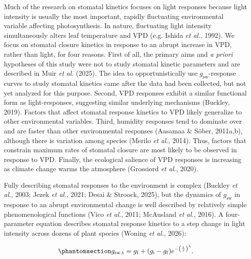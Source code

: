 \documentclass[
  letterpaper,
  DIV=11,
  numbers=noendperiod]{scrartcl}
\newcommand{\gsw}{$g_\mathrm{sw}$}
\begin{document}
Much of the research on stomatal kinetics focuses on light responses
because light intensity is usually the most important, rapidly
fluctuating environmental variable affecting photosynthesis. In nature,
fluctuating light intensity simultaneously alters leaf temperature and
VPD (e.g. Ishida \emph{et al.}, 1992). We focus on stomatal closure
kinetics in response to an abrupt increase in VPD, rather than light,
for four reasons. First of all, the primary aims and \emph{a priori}
hypotheses of this study were not to study stomatal kinetic parameters
and are described in Muir \emph{et al.} (2025). The idea to
opportunistically use \gsw-response curves to study stomatal kinetics
came after the data had been collected, but not yet analyzed for this
purpose. Second, VPD responses exhibit a similar functional form as
light-responses, suggesting similar underlying mechanisms (Buckley,
2019). Factors that affect stomatal response kinetics to VPD likely
generalize to other environmental variables. Third, humidity responses
tend to dominate over and are faster than other environmental responses
(Aasamaa \& Sõber, 2011a,b), although there is variation among species
(Merilo \emph{et al.}, 2014). Thus, factors that constrain maximum rates
of stomatal closure are most likely to be observed in response to VPD.
Finally, the ecological salience of VPD responses is increasing as
climate change warms the atmosphere (Grossiord \emph{et al.}, 2020).

Fully describing stomatal responses to the environment is complex
(Buckley \emph{et al.}, 2003; Jezek \emph{et al.}, 2021; Desai \&
Stroock, 2025), but the dynamics of \gsw{} in response to an abrupt
environmental change is well described by relatively simple
phenomenological functions (Vico \emph{et al.}, 2011; McAusland \emph{et
al.}, 2016). A four-parameter equation describes stomatal response
kinetics to a step change in light intensity across dozens of plant
species (Woning \emph{et al.}, 2026):

\begin{equation}\phantomsection\label{eq-weibull}{
  g_\mathrm{sw,t} = g_\mathrm{f} + (g_\mathrm{i} - g_\mathrm{f}) e^{-\left(\frac{t}{\tau}\right)^\lambda}.
}\end{equation}
\end{document}

